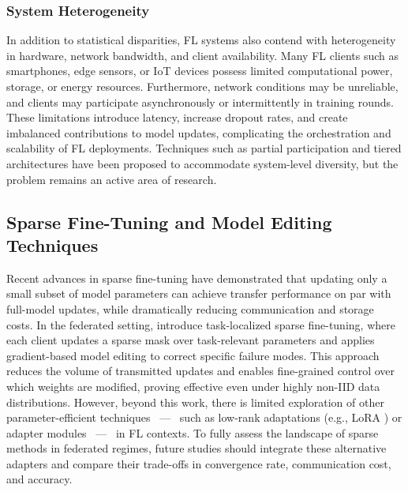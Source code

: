 \documentclass[10pt,twocolumn,letterpaper]{article}
\begin{document}
\subsubsection{System Heterogeneity}

In addition to statistical disparities, FL systems also contend with heterogeneity in hardware, network bandwidth, and client availability. Many FL clients such as smartphones, edge sensors, or IoT devices possess limited computational power, storage, or energy resources. Furthermore, network conditions may be unreliable, and clients may participate asynchronously or intermittently in training rounds. These limitations introduce latency, increase dropout rates, and create imbalanced contributions to model updates, complicating the orchestration and scalability of FL deployments. Techniques such as partial participation and tiered architectures have been proposed to accommodate system-level diversity, but the problem remains an active area of research.

\subsection{Sparse Fine-Tuning and Model Editing Techniques}
Recent advances in sparse fine-tuning have demonstrated that updating only a small subset of model parameters can achieve transfer performance on par with full-model updates, while dramatically reducing communication and storage costs. In the federated setting, \cite{iurada2025efficient} introduce task-localized sparse fine-tuning, where each client updates a sparse mask over task-relevant parameters and applies gradient-based model editing to correct specific failure modes. This approach reduces the volume of transmitted updates and enables fine-grained control over which weights are modified, proving effective even under highly non-IID data distributions. However, beyond this work, there is limited exploration of other parameter-efficient techniques ~—~ such as low-rank adaptations (e.g., LoRA \cite{hu2021lora}) or adapter modules ~—~ in FL contexts. To fully assess the landscape of sparse methods in federated regimes, future studies should integrate these alternative adapters and compare their trade-offs in convergence rate, communication cost, and accuracy.
\end{document}
